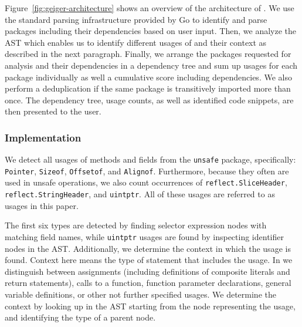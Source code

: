 Figure~\ref{fig:geiger-architecture} shows an overview of the architecture of \toolUsage{}.
We use the standard parsing infrastructure provided by Go to identify and parse packages including their dependencies based on user input.
Then, we analyze the AST %
which enables us to identify different usages of \unsafe{} and their context as described in the next paragraph.
Finally, we arrange the packages requested for analysis and their dependencies in a dependency tree and sum up \unsafe{} usages for each package individually as well a cumulative score including dependencies.
We also perform a deduplication if the same package is transitively imported more than once.
The \unsafe{} dependency tree, usage counts, as well as identified code snippets, are then presented to the user.

\subsubsection*{Implementation}

We detect all usages of methods and fields from the \texttt{unsafe} package, specifically: \texttt{Pointer}, \texttt{Sizeof}, \texttt{Offsetof}, and \texttt{Alignof}.
Furthermore, because they often are used in unsafe operations, we also count occurrences of \texttt{reflect.SliceHeader}, \texttt{reflect.StringHeader}, and \texttt{uintptr}.
All of these usages are referred to as \unsafe{} usages in this paper.

The first six \unsafe{} types are detected by finding selector expression nodes with matching field names, while \texttt{uintptr} usages are found by inspecting identifier nodes in the AST.
Additionally, we determine the context in which the \unsafe{} usage is found.
Context here means the type of statement that includes the \unsafe{} usage.
In \toolUsage{} we distinguish between assignments (including definitions of composite literals and return statements), calls to a function, function parameter declarations, general variable definitions, or other not further specified usages.
We determine the context by looking up in the AST starting from the node representing the \unsafe{} usage, and identifying the type of a parent node.
